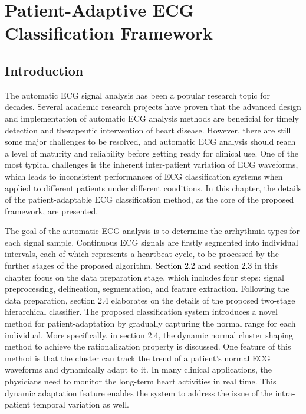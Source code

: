 \chapter{Patient-Adaptive ECG Classification Framework}

\section{Introduction}
The automatic ECG signal analysis has been a popular research topic for decades. Several academic research projects have proven that the advanced design and implementation of automatic ECG analysis methods are beneficial for timely detection and therapeutic intervention of heart disease. However, there are still some major challenges to be resolved, and automatic ECG analysis should reach a level of maturity and reliability before getting ready for clinical use. One of the most typical challenges is the inherent inter-patient variation of ECG waveforms, which leads to inconsistent performances of ECG classification systems when applied to different patients under different conditions. In this chapter, the details of the patient-adaptable ECG classification method, as the core of the proposed framework, are presented.

The goal of the automatic ECG analysis is to determine the arrhythmia types for each signal sample. Continuous ECG signals are firstly segmented into individual intervals, each of which represents a heartbeat cycle, to be processed by the further stages of the proposed algorithm. \textcolor{black}{Section 2.2 and section 2.3} in this chapter focus on the data preparation stage, which includes four steps: signal preprocessing, delineation, segmentation, and feature extraction. Following the data preparation, \textcolor{black}{section 2.4} elaborates on the details of the proposed two-stage hierarchical classifier. The proposed classification system introduces a novel method for patient-adaptation by gradually capturing the normal range for each individual. More specifically, in section 2.4, the dynamic normal cluster shaping method to achieve the rationalization property is discussed. One feature of this method is that the cluster can track the trend of a patient's normal ECG waveforms and dynamically adapt to it. In many clinical applications, the physicians need to monitor the long-term heart activities in real time. This dynamic adaptation feature enables the system to address the issue of the intra-patient temporal variation as well.

